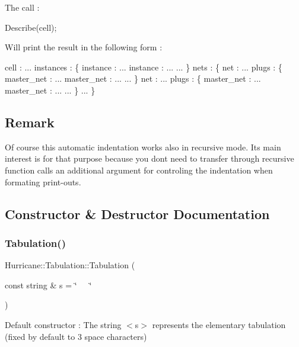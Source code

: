  The call \+: 
\begin{DoxyCode}
Describe(cell);
\end{DoxyCode}
 Will print the result in the following form \+: 
\begin{DoxyCode}
cell : ...
   instances : \{
      instance : ...
      instance : ...
      ...
   \}
   nets : \{
      net : ...
         plugs : \{
            master\_net : ...
            master\_net : ...
            ...
         \}
      net : ...
         plugs : \{
            master\_net : ...
            master\_net : ...
            ...
         \}
      ...
   \}
\end{DoxyCode}
\hypertarget{classHurricane_1_1Tabulation_secTabulationRemark}{}\subsection{Remark}\label{classHurricane_1_1Tabulation_secTabulationRemark}
Of course this automatic indentation works also in recursive mode. Its main interest is for that purpose because you don\textquotesingle{}t need to transfer through recursive function calls an additional argument for controling the indentation when formating print-\/outs. 

\subsection{Constructor \& Destructor Documentation}
\mbox{\label{classHurricane_1_1Tabulation_a59932db80223de3ba630592218cb1005}} 
\subsubsection{\texorpdfstring{Tabulation()}{Tabulation()}\hspace{0.1cm}{\footnotesize\ttfamily [1/2]}}
{\footnotesize\ttfamily Hurricane\+::\+Tabulation\+::\+Tabulation (\begin{DoxyParamCaption}\item[{const string \&}]{s = {\ttfamily \char`\"{}~~~\char`\"{}} }\end{DoxyParamCaption})}

Default constructor \+: The string {\ttfamily $<$s$>$} represents the elementary tabulation (fixed by default to 3 space characters) \mbox{\label{classHurricane_1_1Tabulation_a78f765f6b4fc0e629f5d3babf7a785aa}} 

